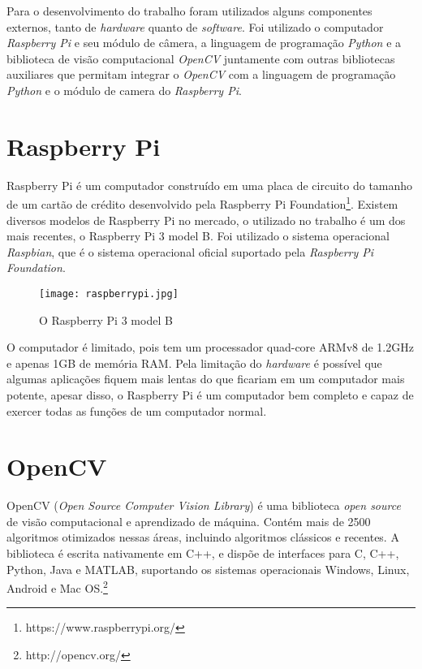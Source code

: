 Para o desenvolvimento do trabalho foram utilizados alguns componentes externos, tanto de \emph{hardware} quanto de \emph{software}. Foi utilizado o computador \emph{Raspberry Pi} e seu módulo de câmera, a linguagem de programação \emph{Python} e a biblioteca de visão computacional \emph{OpenCV} juntamente com outras bibliotecas auxiliares que permitam integrar o \emph{OpenCV} com a linguagem de programação \emph{Python} e o módulo de camera do \emph{Raspberry Pi}.

\section{Raspberry Pi}
\label{sec:raspi}

Raspberry Pi é um computador construído em uma placa de circuito do tamanho de um cartão de crédito desenvolvido pela Raspberry Pi Foundation\footnote{https://www.raspberrypi.org/}. Existem diversos modelos de Raspberry Pi no mercado, o utilizado no trabalho é um dos mais recentes, o Raspberry Pi 3 model B. Foi utilizado o sistema
operacional \emph{Raspbian}, que é o sistema operacional oficial suportado pela \emph{Raspberry Pi Foundation}.

\begin{figure}[H]
	\centering
	\texttt{[image: raspberrypi.jpg]}
	\caption{O Raspberry Pi 3 model B}
	\label{fig:raspberrypi}
\end{figure}

O computador é limitado, pois tem um processador
quad-core ARMv8 de 1.2GHz e apenas 1GB de memória RAM\@. Pela limitação do
\emph{hardware} é possível que algumas aplicações fiquem mais lentas do que
ficariam em um computador mais potente, apesar disso, o Raspberry Pi é um
computador bem completo e capaz de exercer todas as funções de um computador
normal.

\section{OpenCV}
\label{sec:opencv}

OpenCV (\emph{Open Source Computer Vision Library}) é uma biblioteca \emph{open
source} de visão computacional e aprendizado de máquina. Contém mais de 2500
algoritmos otimizados nessas áreas, incluindo algoritmos clássicos e recentes. A biblioteca é escrita nativamente em C++, e dispõe de interfaces para C, C++,
Python, Java e MATLAB, suportando os sistemas operacionais Windows, Linux,
Android e Mac OS.\footnote{http://opencv.org/}

